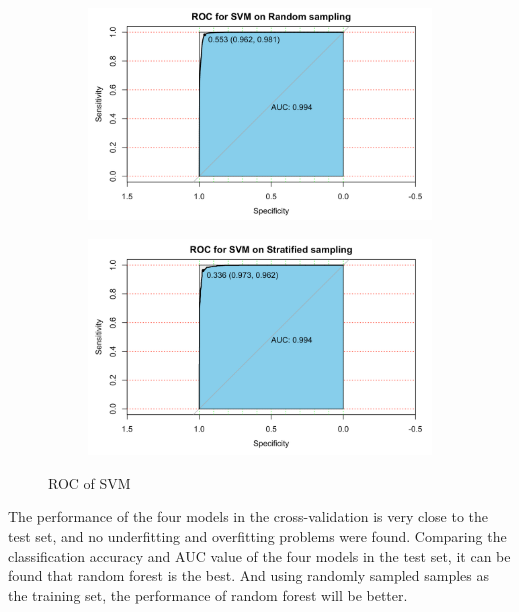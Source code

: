 \documentclass[11pt]{article}
\begin{document}
\begin{itemize}
\begin{figure}[H]
\begin{subfigure}{.5\textwidth}
      \includegraphics[width=1\textwidth, height=0.65\textwidth]{../figures/ROC_SVM_random.png}    
  \end{subfigure}%
  \begin{subfigure}{.5\textwidth}
    \centering
      \includegraphics[width=1\textwidth, height=0.65\textwidth]{../figures/ROC_SVM_s.png}
  \end{subfigure}%
  \caption{ROC of SVM}
\end{figure}
\end{itemize}

The performance of the four models in the cross-validation is very close to the test set, and no underfitting and overfitting problems were found. Comparing the classification accuracy and AUC value of the four models in the test set, it can be found that random forest is the best. And using randomly sampled samples as the training set, the performance of random forest will be better.
\end{document}
